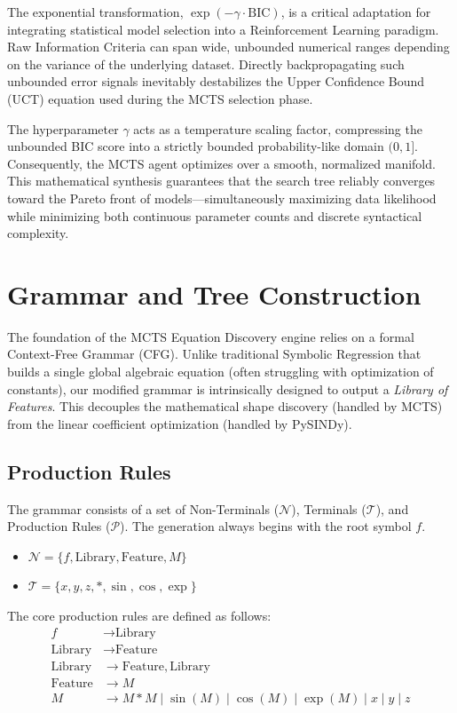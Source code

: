 \documentclass[11pt,a4paper]{article}
\begin{document}
The exponential transformation, $\exp(-\gamma \cdot \text{BIC})$, is a critical adaptation for integrating statistical model selection into a Reinforcement Learning paradigm. Raw Information Criteria can span wide, unbounded numerical ranges depending on the variance of the underlying dataset. Directly backpropagating such unbounded error signals inevitably destabilizes the Upper Confidence Bound (UCT) equation used during the MCTS selection phase.

The hyperparameter $\gamma$ acts as a temperature scaling factor, compressing the unbounded BIC score into a strictly bounded probability-like domain $(0, 1]$. Consequently, the MCTS agent optimizes over a smooth, normalized manifold. This mathematical synthesis guarantees that the search tree reliably converges toward the Pareto front of models—simultaneously maximizing data likelihood while minimizing both continuous parameter counts and discrete syntactical complexity.

\section{Grammar and Tree Construction}
\label{sec:grammar_tree}

The foundation of the MCTS Equation Discovery engine relies on a formal Context-Free Grammar (CFG). Unlike traditional Symbolic Regression that builds a single global algebraic equation (often struggling with optimization of constants), our modified grammar is intrinsically designed to output a \textit{Library of Features}. This decouples the mathematical shape discovery (handled by MCTS) from the linear coefficient optimization (handled by PySINDy).

\subsection{Production Rules}
The grammar consists of a set of Non-Terminals ($\mathcal{N}$), Terminals ($\mathcal{T}$), and Production Rules ($\mathcal{P}$). The generation always begins with the root symbol $f$.
\begin{itemize}
    \item $\mathcal{N} = \{f, \text{Library}, \text{Feature}, M\}$
    \item $\mathcal{T} = \{x, y, z, *, \sin, \cos, \exp\}$
\end{itemize}

The core production rules are defined as follows:
\begin{align*}
    f &\rightarrow \text{Library} \\
    \text{Library} &\rightarrow \text{Feature} \\
    \text{Library} &\rightarrow \text{Feature}, \text{Library} \\
    \text{Feature} &\rightarrow M \\
    M &\rightarrow M * M \mid \sin(M) \mid \cos(M) \mid \exp(M) \mid x \mid y \mid z
\end{align*}
\end{document}
